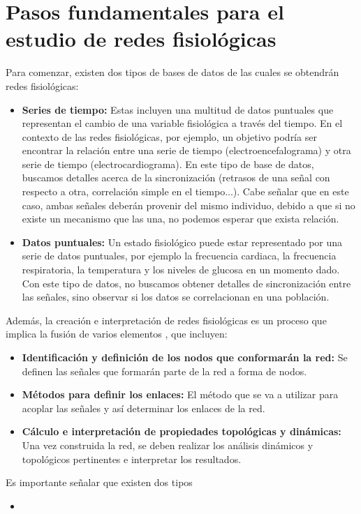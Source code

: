 \documentclass[twoside,twocolumn]{article}
\begin{document}
\section{Pasos fundamentales para el estudio de redes fisiológicas}
Para comenzar, existen dos tipos de bases de datos de las cuales se obtendrán redes fisiológicas:
\begin{itemize}
  \item \textbf{Series de tiempo:} Estas incluyen una multitud de datos puntuales que representan el cambio de una variable fisiológica a través del tiempo.
  En el contexto de las redes fisiológicas, por ejemplo, un objetivo podría ser encontrar la relación entre una serie de tiempo (electroencefalograma) y otra serie de tiempo (electrocardiograma).
  En este tipo de base de datos, buscamos detalles acerca de la sincronización (retrasos de una señal con respecto a otra, correlación simple en el tiempo...).
  Cabe señalar que en este caso, ambas señales deberán provenir del mismo individuo, debido a que si no existe un mecanismo que las una, no podemos esperar que exista relación\cite{bashan2012network}.
  \item \textbf{Datos puntuales:} Un estado fisiológico puede estar representado por una serie de datos puntuales, por ejemplo la frecuencia cardiaca, la frecuencia respiratoria, la temperatura y los niveles de glucosa en un momento dado.
  Con este tipo de datos, no buscamos obtener detalles de sincronización entre las señales, sino observar si los datos se correlacionan en una población\cite{barajas2021physiological}.
\end{itemize}
Además, la creación e interpretación de redes fisiológicas es un proceso que implica la fusión de varios elementos \cite{barajas2021sex}, que incluyen:
\begin{itemize}
  \item \textbf{Identificación y definición de los nodos que conformarán la red:} Se definen las señales que formarán parte de la red a forma de nodos.
  \item \textbf{Métodos para definir los enlaces:} El método que se va a utilizar para acoplar las señales y así determinar los enlaces de la red.
  \item \textbf{Cálculo e interpretación de propiedades topológicas y dinámicas:} Una vez construida la red, se deben realizar los análisis dinámicos y topológicos pertinentes e interpretar los resultados.
\end{itemize}

Es importante señalar que existen dos tipos
\begin{itemize}
  \item
\end{itemize}
\end{document}
